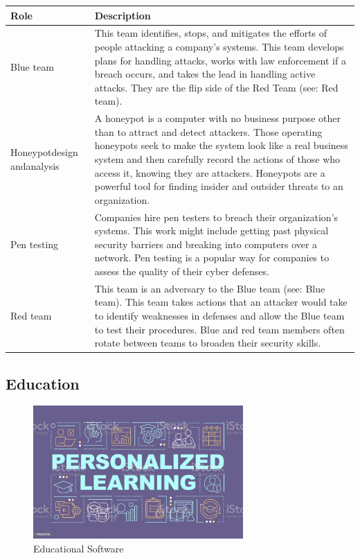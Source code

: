 \begin{table}[H]
	\begin{center}
		\begin{tabular}{p{1in}|p{3.4in}} 
			\textbf{Role} & \textbf{Description}\\
			\hline
			Blue team & This team identifies, stops, and mitigates the efforts of people attacking a company's systems. This team develops plans for handling attacks, works with law enforcement if a breach occurs, and takes the lead in handling active attacks. They are the flip side of the Red Team (see: Red team).\\
			\hline
			Honeypot\linebreak design and\linebreak analysis & A honeypot is a computer with no business purpose other than to attract and detect attackers. Those operating honeypots seek to make the system look like a real business system and then carefully record the actions of those who access it, knowing they are attackers. Honeypots are a powerful tool for finding insider and outsider threats to an organization.\\
			\hline
			Pen testing & Companies hire pen testers to breach their organization's systems. This work might include getting past physical security barriers and breaking into computers over a network. Pen testing is a popular way for companies to assess the quality of their cyber defenses.\\
			\hline
			Red team & This team is an adversary to the Blue team (see: Blue team). This team takes actions that an attacker would take to identify weaknesses in defenses and allow the Blue team to test their procedures. Blue and red team members often rotate between teams to broaden their security skills.\\
			\hline
		\end{tabular}
	\end{center}
\end{table}


\subsection{Education}

\begin{figure}[H]
	\begin{center}
		\caption{Educational Software}
		\vskip 4pt
		\includegraphics[height=2in]{images/careers/istockphoto-1394432243-1024x1024.jpg}
	\end{center}
\end{figure}

